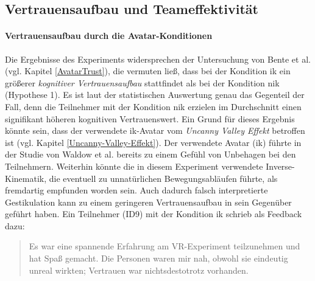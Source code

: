 \documentclass[a4paper,11pt]{article}%
\renewcommand{\\}{\vspace*{0.5\baselineskip} \newline}
\begin{document}
{{%

%


\subsection{Vertrauensaufbau und Teameffektivität}
\paragraph{Vertrauensaufbau durch die Avatar-Konditionen}

Die Ergebnisse des Experiments widersprechen der Untersuchung von Bente et al. (vgl. Kapitel \ref{AvatarTrust}), die vermuten ließ, dass bei der Kondition \ac{ik} ein größerer \textit{kognitiver Vertrauensaufbau} stattfindet als bei der Kondition \ac{nik} (Hypothese 1). Es ist laut der statistischen Auswertung genau das Gegenteil der Fall, denn die Teilnehmer mit der Kondition \ac{nik} erzielen im Durchschnitt einen signifikant höheren kognitiven Vertrauenswert.
Ein Grund für dieses Ergebnis könnte sein, dass der verwendete \ac{ik}-Avatar vom \textit{Uncanny Valley Effekt} betroffen ist (vgl. Kapitel \ref{Uncanny-Valley-Effekt}). Der verwendete Avatar (\ac{ik}) führte in der Studie von Waldow et al. \citep{waldow2019investigating} bereits zu einem Gefühl von Unbehagen bei den Teilnehmern.
Weiterhin könnte die in diesem Experiment verwendete Inverse-Kinematik, die eventuell zu unnatürlichen Bewegungsabläufen führte, als fremdartig empfunden worden sein. Auch dadurch falsch interpretierte Gestikulation kann zu einem geringeren Vertrauensaufbau in sein Gegenüber geführt haben. Ein Teilnehmer (ID9) mit der Kondition \ac{ik} schrieb als Feedback dazu:
\begin{quote}
\glqq{}Es war eine spannende Erfahrung am VR-Experiment teilzunehmen und hat Spaß gemacht. Die
Personen waren mir nah, obwohl sie eindeutig unreal wirkten; Vertrauen war nichtsdestotrotz vorhanden.\dq{}
\end{quote}

}}
\end{document}
